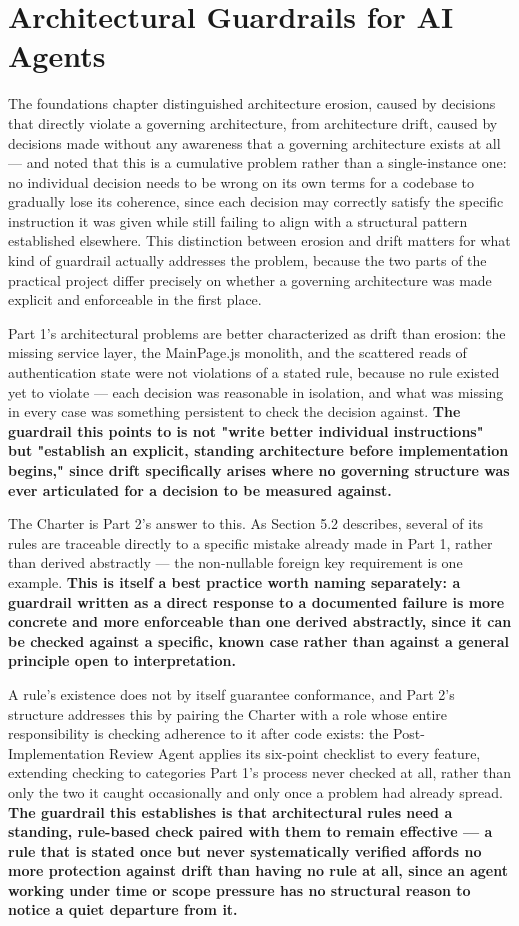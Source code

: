 \section{Architectural Guardrails for AI Agents}

The foundations chapter distinguished architecture erosion, caused by decisions that directly violate a governing architecture, from architecture drift, caused by decisions made without any awareness that a governing architecture exists at all --- and noted that this is a cumulative problem rather than a single-instance one: no individual decision needs to be wrong on its own terms for a codebase to gradually lose its coherence, since each decision may correctly satisfy the specific instruction it was given while still failing to align with a structural pattern established elsewhere. This distinction between erosion and drift matters for what kind of guardrail actually addresses the problem, because the two parts of the practical project differ precisely on whether a governing architecture was made explicit and enforceable in the first place.

Part 1's architectural problems are better characterized as drift than erosion: the missing service layer, the MainPage.js monolith, and the scattered reads of authentication state were not violations of a stated rule, because no rule existed yet to violate --- each decision was reasonable in isolation, and what was missing in every case was something persistent to check the decision against. \textbf{The guardrail this points to is not "write better individual instructions" but "establish an explicit, standing architecture before implementation begins," since drift specifically arises where no governing structure was ever articulated for a decision to be measured against.}

The Charter is Part 2's answer to this. As Section 5.2 describes, several of its rules are traceable directly to a specific mistake already made in Part 1, rather than derived abstractly --- the non-nullable foreign key requirement is one example. \textbf{This is itself a best practice worth naming separately: a guardrail written as a direct response to a documented failure is more concrete and more enforceable than one derived abstractly, since it can be checked against a specific, known case rather than against a general principle open to interpretation.}

A rule's existence does not by itself guarantee conformance, and Part 2's structure addresses this by pairing the Charter with a role whose entire responsibility is checking adherence to it after code exists: the Post-Implementation Review Agent applies its six-point checklist to every feature, extending checking to categories Part 1's process never checked at all, rather than only the two it caught occasionally and only once a problem had already spread. \textbf{The guardrail this establishes is that architectural rules need a standing, rule-based check paired with them to remain effective --- a rule that is stated once but never systematically verified affords no more protection against drift than having no rule at all, since an agent working under time or scope pressure has no structural reason to notice a quiet departure from it.}

